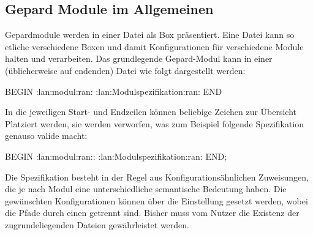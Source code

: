 \subsection{Gepard Module im Allgemeinen}
Gepardmodule werden in einer Datei als Box präsentiert. Eine Datei kann so etliche verschiedene Boxen und damit Konfigurationen für verschiedene Module halten und verarbeiten. Das grundlegende Gepard-Modul kann in einer (üblicherweise auf  endenden) Datei wie folgt dargestellt werden:
\begin{gepard}
BEGIN :lan:modul:ran:
    :lan:Modulspezifikation:ran:
END
\end{gepard}
In die jeweiligen Start- und Endzeilen können beliebige Zeichen zur Übersicht Platziert werden, sie werden verworfen, was zum Beispiel folgende Spezifikation genauso valide macht:
\begin{gepard}
BEGIN :lan:modul:ran::
    :lan:Modulspezifikation:ran:
END;
\end{gepard}
Die Spezifikation besteht in der Regel aus Konfigurationsähnlichen Zuweisungen, die je nach Modul eine unterschiedliche semantische Bedeutung haben. Die gewünschten Konfigurationen können über die Einstellung  %
gesetzt werden, wobei die Pfade durch einen \say{\T{:}} getrennt sind. Bisher muss vom Nutzer die Existenz der zugrundeliegenden Dateien gewährleistet werden.

